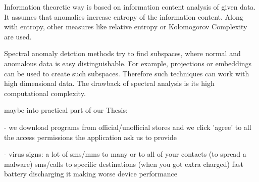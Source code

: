 Information theoretic way is based on information content analysis of given data.
It assumes that anomalies increase entropy of the information content.
Along with entropy, other measures like relative entropy or Kolomogorov Complexity are used.

Spectral anomaly detction methods try to find subspaces, where normal and anomalous data is easy distinguishable.
For example, projections or embeddings can be used to create such subspaces.
Therefore such techniques can work with high dimensional data.
The drawback of spectral analysis is its high computational complexity.   
  


 
  

  



maybe into practical part of our Thesis:

- we download programs from official/unofficial stores and we click 'agree' to all the access permissions the application ask us to provide
 
- virus signs:
a lot of sms/mms to many or to all of your contacts (to spread a malware) 
sms/calls to specific destinations (when you got extra charged)
fast battery discharging
it making worse device performance 


 


